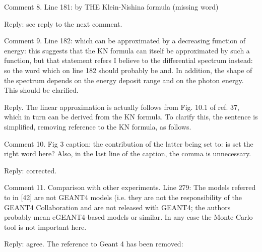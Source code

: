\documentclass[page-classic]{epl2}
\begin{document}
Comment 8. Line 181: by THE Klein-Nishina formula (missing word)

\vspace{0.5 cm}

Reply: see reply to the next comment.

\vspace{0.5 cm}

Comment 9. Line 182: which can be approximated by a decreasing
function of energy:  this suggests that the KN formula can itself be
approximated by such a function, but that statement refers I believe
to the differential spectrum instead: so the word which on line 182
should probably be and. In addition, the shape of the spectrum
depends on the energy deposit range and on the photon energy. This
should be clarified.

\vspace{0.5 cm}

Reply. The linear approximation is actually follows from Fig. 10.1
of ref. 37, which in turn can be derived from the KN formula. To
clarify this, the sentence is simplified, removing reference to the
KN formula, as follows.

\vspace{0.5 cm}



\vspace{0.5 cm}

Comment 10. Fig 3 caption: the contribution of the latter being set
to: is set the right word here?  Also, in the last line of the
caption, the comma is unnecessary.

\vspace{0.5 cm}

Reply: corrected.

\vspace{0.5 cm}

Comment 11. Comparison with other experiments. Line 279: The models
referred to in [42] are not GEANT4 models  (i.e. they are not the
responsibility of the GEANT4 Collaboration and are not released with
GEANT4; the authors probably mean eGEANT4-based models or similar.
In any case the Monte Carlo tool is not important here.

\vspace{0.5 cm}

Reply: agree. The reference to Geant 4 has been removed:
\end{document}

